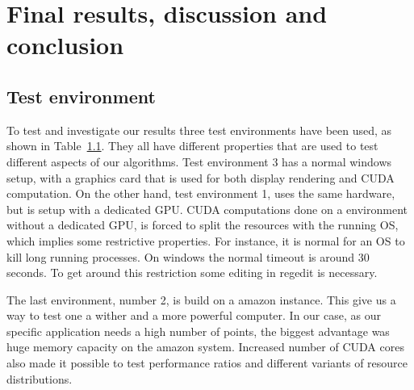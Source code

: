 
\chapter{Final results, discussion and conclusion} %
\label{sec:final_results_discussion_and_conclusion}

\section{Test environment} %
\label{sec:test_environment}

To test and investigate our results three test environments have been used, as shown in Table~\ref{sec:test_environment}. They all have different properties that are used to test different aspects of our algorithms. Test environment 3 has a normal windows setup, with a graphics card that is used for both display rendering and CUDA computation. On the other hand, test environment 1, uses the same hardware, but is setup with a dedicated GPU\@. CUDA computations done on a environment without a dedicated GPU, is forced to split the resources with the running OS, which implies some restrictive properties. For instance, it is normal for an OS to kill long running processes. On windows the normal timeout is around $30$ seconds. To get around this restriction some editing in regedit is necessary.

The last environment, number 2, is build on a amazon instance. This give us a way to test one a wither and a more powerful computer. In our case, as our specific application needs a high number of points, the biggest advantage was huge memory capacity on the amazon system. Increased number of CUDA cores also made it possible to test performance ratios and different variants of resource distributions. 

